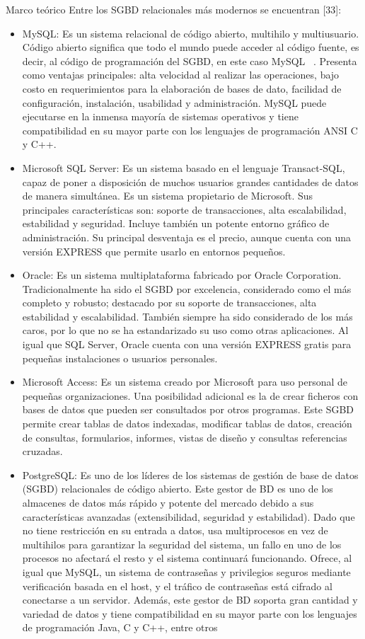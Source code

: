 \begin{thesischapter}{1} {Marco teórico}
    \vspace{10pt}
    Entre los SGBD relacionales más modernos se encuentran [33]:
    \begin{itemize}
    \item MySQL: Es un sistema relacional de código abierto, multihilo y multiusuario. Código abierto significa que todo el mundo puede acceder al código fuente, es decir, al código de programación del SGBD, en este caso MySQL ~\cite{ian2003biblia}. Presenta como ventajas principales: alta velocidad al realizar las operaciones, bajo costo en requerimientos para la elaboración de bases de dato, facilidad de configuración, instalación, usabilidad y administración. MySQL puede ejecutarse en la inmensa mayoría de sistemas operativos y tiene compatibilidad en su mayor parte con los lenguajes de programación ANSI C y C++. 
    \item Microsoft SQL Server: Es un sistema basado en el lenguaje Transact-SQL, capaz de poner a disposición de muchos usuarios grandes cantidades de datos de manera simultánea. Es un sistema propietario de Microsoft. Sus principales características son: soporte de transacciones, alta escalabilidad, estabilidad y seguridad. Incluye también un potente entorno gráfico de administración. Su principal desventaja es el precio, aunque cuenta con una versión EXPRESS que permite usarlo en entornos pequeños. 
    \item Oracle: Es un sistema multiplataforma fabricado por Oracle Corporation. Tradicionalmente ha sido el SGBD por excelencia, considerado como el más completo y robusto; destacado por su soporte de transacciones, alta estabilidad y escalabilidad. También siempre ha sido considerado de los más caros, por lo que no se ha estandarizado su uso como otras aplicaciones. Al igual que SQL Server, Oracle cuenta con una versión EXPRESS gratis para pequeñas instalaciones o usuarios personales. 
    \item Microsoft Access: Es un sistema creado por Microsoft para uso personal de pequeñas organizaciones. Una posibilidad adicional es la de crear ficheros con bases de datos que pueden ser consultados por otros programas. Este SGBD permite crear tablas de datos indexadas, modificar tablas de datos, creación de consultas, formularios, informes, vistas de diseño y consultas referencias cruzadas. 
    \item PostgreSQL: Es uno de los líderes de los sistemas de gestión de base de datos (SGBD) relacionales de código abierto. Este gestor de BD es uno de los almacenes de datos más rápido y potente del mercado debido a sus características avanzadas (extensibilidad, seguridad y estabilidad). Dado que no tiene restricción en su entrada a datos, usa multiprocesos en vez de multihilos para garantizar la seguridad del sistema, un fallo en uno de los procesos no afectará el resto y el sistema continuará funcionando. Ofrece, al igual que MySQL, un sistema de contraseñas y privilegios seguros mediante verificación basada en el host, y el tráfico de contraseñas está cifrado al conectarse a un servidor. Además, este gestor de BD soporta gran cantidad y variedad de datos y tiene compatibilidad en su mayor parte con los lenguajes de programación Java, C y C++, entre otros 

\end{itemize}
\end{thesischapter}
